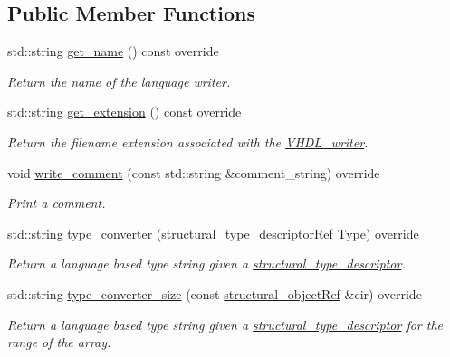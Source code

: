 \subsection*{Public Member Functions}
\begin{DoxyCompactItemize}
\item 
std\+::string \hyperlink{structVHDL__writer_a1bf07f430f6ea252ea65286d2b2b5ded}{get\+\_\+name} () const override
\begin{DoxyCompactList}\small\item\em Return the name of the language writer. \end{DoxyCompactList}\item 
std\+::string \hyperlink{structVHDL__writer_aa4075167cf0d866eb3ffe02f3fcfb5c1}{get\+\_\+extension} () const override
\begin{DoxyCompactList}\small\item\em Return the filename extension associated with the \hyperlink{structVHDL__writer}{V\+H\+D\+L\+\_\+writer}. \end{DoxyCompactList}\item 
void \hyperlink{structVHDL__writer_a9e5dd9daf73ae7621fd861dd1ad81f41}{write\+\_\+comment} (const std\+::string \&comment\+\_\+string) override
\begin{DoxyCompactList}\small\item\em Print a comment. \end{DoxyCompactList}\item 
std\+::string \hyperlink{structVHDL__writer_aaadfd937b71dd556923b7e20e18cab60}{type\+\_\+converter} (\hyperlink{structural__objects_8hpp_a219296792577e3292783725961506c83}{structural\+\_\+type\+\_\+descriptor\+Ref} Type) override
\begin{DoxyCompactList}\small\item\em Return a language based type string given a \hyperlink{structstructural__type__descriptor}{structural\+\_\+type\+\_\+descriptor}. \end{DoxyCompactList}\item 
std\+::string \hyperlink{structVHDL__writer_aebe9a464e894d42bd3493c104d537e7f}{type\+\_\+converter\+\_\+size} (const \hyperlink{structural__objects_8hpp_a8ea5f8cc50ab8f4c31e2751074ff60b2}{structural\+\_\+object\+Ref} \&cir) override
\begin{DoxyCompactList}\small\item\em Return a language based type string given a \hyperlink{structstructural__type__descriptor}{structural\+\_\+type\+\_\+descriptor} for the range of the array. \end{DoxyCompactList}\item 

\end{DoxyCompactItemize}
